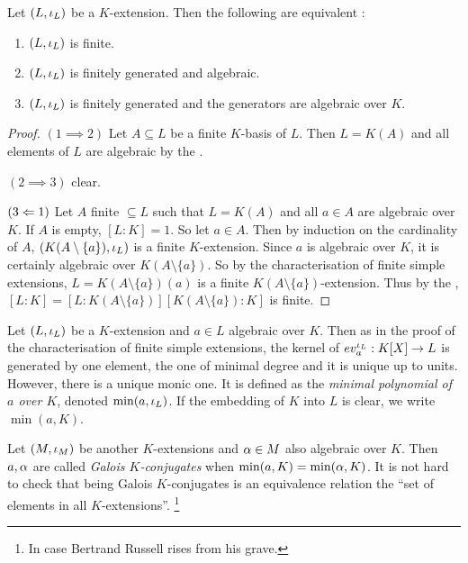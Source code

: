 \documentclass[main.tex]{subfiles}
\begin{document}
\begin{thm} 
  
  Let $(L,\iota_L)$ be a $K$-extension.
  Then the following are equivalent : 
  \begin{enumerate}
    \item $(L,\iota_L)$ is finite. 
    \item $(L,\iota_L)$ is finitely generated and algebraic.   
    \item $(L,\iota_L)$ is finitely generated and 
    the generators are algebraic over $K$. 
  \end{enumerate}
\end{thm}
\begin{proof}
  $(1 \implies 2)$ Let $A \subseteq L$ be a finite $K$-basis of $L$. 
  Then $L = K(A)$ and all elements of $L$ are algebraic by 
  the . 

  $(2 \implies 3)$ clear. 

  $(3 \Leftarrow 1)$ Let $A$ finite $\subseteq L$ such that $L = K(A)$
  and all $a \in A$ are algebraic over $K$. 
  If $A$ is empty, $[L : K] = 1$. 
  So let $a \in A$. 
  Then by induction on the cardinality of $A$, 
  $(K(A\setminus\{a\}),\iota_L)$ is a finite $K$-extension. 
  Since $a$ is algebraic over $K$, 
  it is certainly algebraic over $K(A\setminus\{a\})$. 
  So by the 
  {characterisation of finite simple extensions}, 
  $L = K(A\setminus\{a\})(a)$ is a finite $K(A\setminus\{a\})$-extension. 
  Thus by the , 
  $[L : K] = [L : K(A\setminus\{a\})][K(A\setminus\{a\}) : K]$
  is finite. 
\end{proof}

\begin{dfn}  
  
  Let $(L,\iota_L)$ be a $K$-extension and $a \in L$ algebraic over $K$. 
  Then as in the proof of the 
  {characterisation of finite simple extensions}, 
  the kernel of $ev_a^{\iota_L} : K[X] \to L$ is generated by one element,
  the one of minimal degree and it is unique up to units. 
  However, there is a unique monic one. 
  It is defined as the \emph{minimal polynomial of $a$ over $K$},
  denoted $\min(a,\iota_L)$. 
  If the embedding of $K$ into $L$ is clear, we write $\min(a,K)$. 

  Let $(M,\iota_M)$ be another $K$-extensions and 
  $\alpha \in M$ also algebraic over $K$. 
  Then $a, \alpha$ are called \emph{Galois $K$-conjugates} when 
  $\min(a,K) = \min(\alpha, K)$. 
  It is not hard to check that being Galois $K$-conjugates is 
  an equivalence relation the ``set of elements in all $K$-extensions''. 
  \footnote{In case Bertrand Russell rises from his grave.}
\end{dfn}
\end{document}
